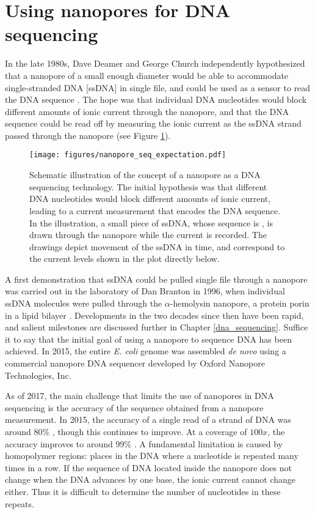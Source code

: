 \section{Using nanopores for DNA sequencing}

In the late 1980s, Dave Deamer and George Church independently hypothesized that a nanopore of a small enough diameter would be able to accommodate single-stranded DNA [ssDNA] in single file, and could be used as a sensor to read the DNA sequence \citep{Branton2008}.  The hope was that individual DNA nucleotides would block different amounts of ionic current through the nanopore, and that the DNA sequence could be read off by measuring the ionic current as the ssDNA strand passed through the nanopore (see Figure \ref{fig:nanopore_seq_expectation}).

\begin{figure}[h]
\begin{centering}
\texttt{[image: figures/nanopore\_seq\_expectation.pdf]}
\caption[Nanopore DNA sequencing concept]{Schematic illustration of the concept of a nanopore as a DNA sequencing technology.  The initial hypothesis was that different DNA nucleotides would block different amounts of ionic current, leading to a current measurement that encodes the DNA sequence.  In the illustration, a small piece of ssDNA, whose sequence is , is drawn through the nanopore while the current is recorded.  The drawings depict movement of the ssDNA in time, and correspond to the current levels shown in the plot directly below.}
\label{fig:nanopore_seq_expectation}
\end{centering}
\end{figure}

A first demonstration that ssDNA could be pulled single file through a nanopore was carried out in the laboratory of Dan Branton in 1996, when individual ssDNA molecules were pulled through the $\alpha$-hemolysin nanopore, a protein porin in a lipid bilayer \citep{Kasianowicz1996}.  Developments in the two decades since then have been rapid, and salient milestones are discussed further in Chapter \ref{dna_sequencing}.  Suffice it to say that the initial goal of using a nanopore to sequence DNA has been achieved.  In 2015, the entire \textit{E. coli} genome was assembled \textit{de novo} using a commercial nanopore DNA sequencer\citep{Loman2015} developed by Oxford Nanopore Technologies, Inc.

As of 2017, the main challenge that limits the use of nanopores in DNA sequencing is the accuracy of the sequence obtained from a nanopore measurement.  In 2015, the accuracy of a single read of a strand of DNA was around 80\% \citep{Loman2015}, though this continues to improve.  At a coverage of $100x$, the accuracy improves to around 99\% \citep{Szalay2015a}.  A fundamental limitation is caused by homopolymer regions: places in the DNA where a nucleotide is repeated many times in a row.  If the sequence of DNA located inside the nanopore does not change when the DNA advances by one base, the ionic current cannot change either.  Thus it is difficult to determine the number of nucleotides in these repeats.

